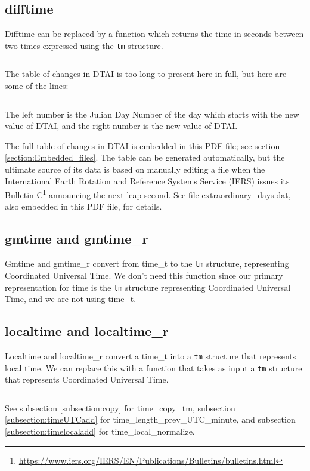 \documentclass[letterpaper,twoside]{article}
\begin{document}
\subsection{difftime}
\label{subsection:difftime}
Difftime can be replaced by a function which returns the time in seconds
between two times expressed using the \verb|tm| structure.
\inputminted[firstline=37]{c}{time_diff.c}
The table of changes in DTAI is too long to present here in full,
but here are some of the lines:
\inputminted[firstline=46880,lastline=46906]{c}{dtai_table.tab}
The left number is the Julian Day Number of the day which starts with
the new value of DTAI, and the right number is the new value of DTAI.

The full table of changes in DTAI is embedded in this PDF file;
see section \ref{section:Embedded_files}.
The table can be generated automatically\citep{JBS_001}, but the ultimate
source of its data is based on manually editing a file when the
International Earth Rotation and Reference Systems Service (IERS)
issues its Bulletin
C\footnote{\url{https://www.iers.org/IERS/EN/Publications/Bulletins/bulletins.html}}
announcing the next leap second.  See file
{\ttfamily extraordinary\_days.dat}, also embedded in this PDF file,
for details.

\subsection{gmtime and gmtime\_r}
Gmtime and gmtime\_r convert from {\ttfamily time\_t} to
the \verb|tm| structure,
representing Coordinated Universal Time.  We don't
need this function since our primary representation for time is the
\verb|tm| structure representing Coordinated Universal Time,
and we are not using {\ttfamily time\_t}.

\subsection{localtime and localtime\_r}
\label{subsection:localtime}
Localtime and localtime\_r convert a {\ttfamily time\_t} into
a \verb|tm| structure that
represents local time.  We can replace this with a function that takes
as input a \verb|tm| structure that represents Coordinated Universal Time.
\inputminted[firstline=32]{c}{time_utc_to_local.c}
See subsection \ref{subsection:copy} for time\_copy\_tm,
subsection \ref{subsection:timeUTCadd} for
time\_\-length\_\-prev\_\-UTC\_\-minute,
and subsection \ref{subsection:timelocaladd} for time\_local\_normalize.
\end{document}
